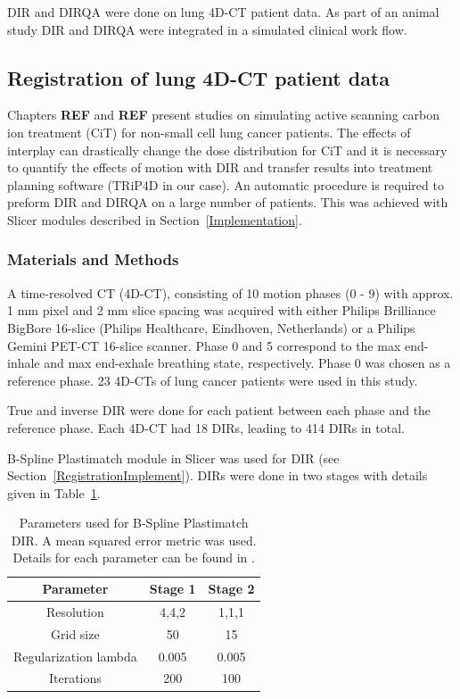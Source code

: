 \documentclass[type=dr, dr=rernat, accentcolor=tud7b,colorbacktitle, bigchapter, openright, twoside, 12pt ]{tudthesis}
\begin{document}
DIR and DIRQA were done on lung 4D-CT patient data. As part of an animal study \cite{Lehmann2015} DIR and DIRQA were integrated in a simulated clinical work flow. 

\subsection{Registration of lung 4D-CT patient data}
\label{lungDIR}

Chapters \textbf{REF} and \textbf{REF} present studies on simulating active scanning carbon ion treatment (CiT) for non-small cell lung cancer patients. The effects of interplay can drastically change the dose distribution for CiT and it is necessary to quantify the effects of motion with DIR and transfer results into treatment planning software (TRiP4D in our case). An automatic procedure is required to preform DIR and DIRQA on a large number of patients. This was achieved with Slicer modules described in Section~\ref{Implementation}.

\subsubsection{Materials and Methods}

A time-resolved CT (4D-CT), consisting of 10 motion phases (0 - 9) with approx. 1 mm pixel and 2 mm slice spacing was acquired with either Philips Brilliance BigBore 16-slice 
(Philips Healthcare, Eindhoven, Netherlands) or a Philips Gemini PET-CT 16-slice scanner. 
Phase 0 and 5 correspond to the max end-inhale and max end-exhale breathing state, respectively. Phase 0 was chosen as a reference phase. 23 4D-CTs of lung cancer patients were used in this study.

True and inverse DIR were done for each patient between each phase and the reference phase. Each 4D-CT had 18 DIRs, leading to 414 DIRs in total.

B-Spline Plastimatch module in Slicer was used for DIR (see Section~\ref{RegistrationImplement}). DIRs were done in two stages with details given in Table~\ref{tab:stages}. 

\begin{table}[H]
  \centering
  \caption{Parameters used for B-Spline Plastimatch DIR. A mean squared error metric was used. Details for each parameter can be found in \cite{Plastimatch}.}
  \begin{tabular}{c|c|c}
      Parameter & Stage 1 & Stage 2 \\
      \hline
      Resolution & 4,4,2 & 1,1,1 \\
      Grid size & 50 & 15 \\
      Regularization lambda & 0.005 & 0.005 \\
      Iterations & 200 & 100 \\
    \hline\hline
  \end{tabular}
  \label{tab:stages}
\end{table}
\end{document}
